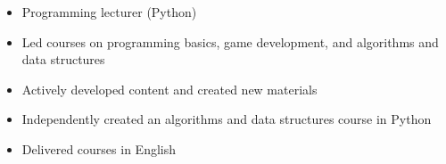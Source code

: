 \documentclass[10pt,a4paper,ragged2e]{altacv}
\begin{document}
\vspace{10px}


\begin{itemize}
\item Programming lecturer (Python)
\item Led courses on programming basics, game development, and algorithms and data structures
\item Actively developed content and created new materials
\item Independently created an algorithms and data structures course in Python
\item Delivered courses in English
\end{itemize}

\nocite{*}






\end{document}
